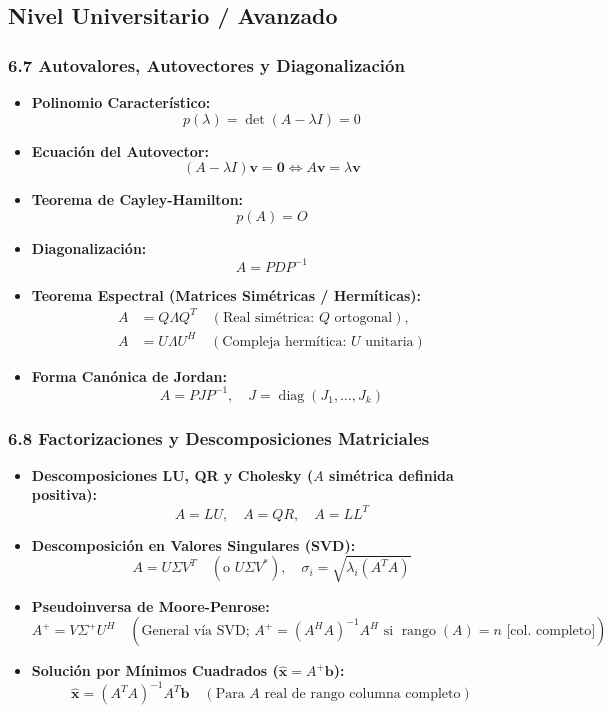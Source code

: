 \documentclass[11pt,a4paper]{article}
\begin{document}
\subsection*{Nivel Universitario / Avanzado}

\subsubsection*{6.7 Autovalores, Autovectores y Diagonalización}

\begin{itemize}
  \item \textbf{Polinomio Característico:}
  \[
    p(\lambda) = \det(A - \lambda I) = 0
  \]
  \item \textbf{Ecuación del Autovector:}
  \[
    (A - \lambda I)\mathbf{v} = \mathbf{0} \iff A\mathbf{v} = \lambda\mathbf{v}
  \]
  \item \textbf{Teorema de Cayley-Hamilton:}
  \[
    p(A) = O
  \]
  \item \textbf{Diagonalización:}
  \[
    A = PDP^{-1}
  \]
  \item \textbf{Teorema Espectral (Matrices Simétricas / Hermíticas):}
  \[
    \begin{aligned}
      A &= Q\Lambda Q^T \quad (\text{Real simétrica: } Q \text{ ortogonal}), \\
      A &= U\Lambda U^H \quad (\text{Compleja hermítica: } U \text{ unitaria})
    \end{aligned}
  \]
  \item \textbf{Forma Canónica de Jordan:}
  \[
    A = PJP^{-1}, \quad J = \operatorname{diag}(J_1, \dots, J_k)
  \]
\end{itemize}

\subsubsection*{6.8 Factorizaciones y Descomposiciones Matriciales}

\begin{itemize}
  \item \textbf{Descomposiciones LU, QR y Cholesky ($A$ simétrica definida positiva):}
  \[
    A = LU, \quad A = QR, \quad A = LL^T
  \]
  \item \textbf{Descomposición en Valores Singulares (SVD):}
  \[
    A = U\Sigma V^T \quad (\text{o } U\Sigma V^*), \quad \sigma_i = \sqrt{\lambda_i(A^T A)}
  \]
  \item \textbf{Pseudoinversa de Moore-Penrose:}
  \[
    A^+ = V\Sigma^+ U^H \quad (\text{General vía SVD; } A^+ = (A^H A)^{-1} A^H \text{ si } \operatorname{rango}(A) = n \text{ [col. completo]})
  \]
  \item \textbf{Solución por Mínimos Cuadrados ($\hat{\mathbf{x}} = A^+ \mathbf{b}$):}
  \[
    \hat{\mathbf{x}} = (A^T A)^{-1} A^T \mathbf{b} \quad (\text{Para } A \text{ real de rango columna completo})
  \]
\end{itemize}
\end{document}
